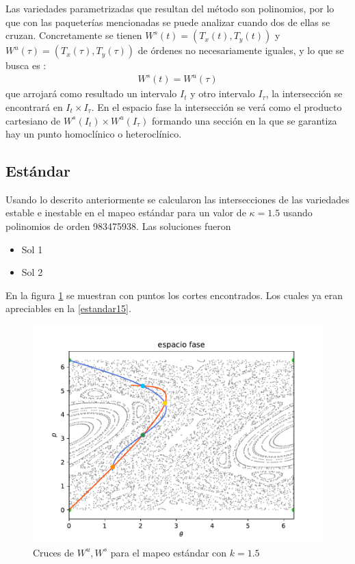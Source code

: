 Las variedades parametrizadas que resultan del método son polinomios, por lo que con las paqueterías  mencionadas se puede analizar cuando dos de ellas se cruzan. Concretamente se tienen  $W^{s}(t)=(T_{x}(t),T_{y}(t))$ y $W^{u}(\tau)=(T_{x}(\tau),T_{y}(\tau))$ de órdenes no necesariamente iguales, y lo que se busca es :
\begin{eqnarray}
W^{s}(t)=W^{u}(\tau)
\end{eqnarray}
que arrojará como resultado un intervalo $I_{t}$ y otro intervalo $I_{\tau}$, la intersección se encontrará en $I_{t}\times I_{\tau}$. En el espacio fase la intersección se verá como el producto cartesiano de $W^{s}(I_{t})\times W^{u}(I_{\tau})$ formando una sección en la que se garantiza hay un punto homoclínico o heteroclínico. 


\subsection{Estándar}
Usando lo descrito anteriormente se calcularon las intersecciones de las variedades estable e inestable en el mapeo estándar para un valor de $\kappa=1.5$ usando polinomios de orden 983475938. Las soluciones fueron
\begin{itemize}
\item Sol 1
\item Sol 2
\end{itemize}
En la figura \ref{cruce_estandar} se muestran con puntos los cortes encontrados. Los cuales ya eran apreciables en la \ref{estandar15}. 


\begin{figure}[H]
\centering
\includegraphics[scale=0.6]{cruce_estandar}
\caption{Cruces de $W^{u},W^{s}$ para el mapeo estándar con $k=1.5$ }
\label{cruce_estandar}
\end{figure}







